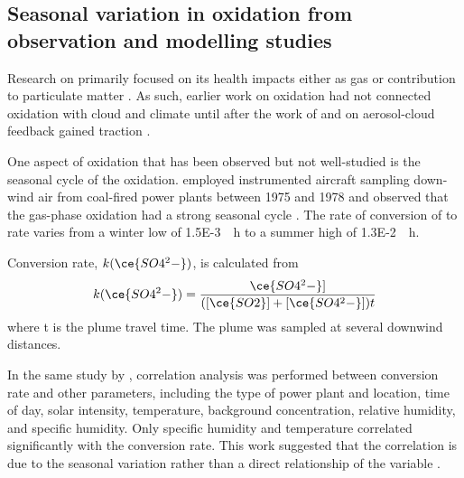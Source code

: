 \subsection{Seasonal variation in \textsoo{}  oxidation from observation and modelling studies}
\label{ch4:seasonal-so2-oxidation-observation}

Research on  primarily focused on its health impacts either as  gas or contribution to particulate matter \citep[e.g. ][]{forrestOnversionRatesPower1981, meagherSeasonalVariationAtmospheric1983,eatoughConversionSO2Sulfate1994, feichterSimulationTroposphericSulfur1996}. As such, earlier work on  oxidation had not connected  oxidation with cloud and climate until after the work of \citet{twomeyInfluencePollutionShortwave1977} and \citet{albrechtAerosolsCloudMicrophysics1989} on aerosol-cloud feedback gained traction \citep{charlsonPerturbationNorthernHemisphere1991, charlsonClimateForcingAnthropogenic1992}.  

One aspect of  oxidation that has been observed but not well-studied is the seasonal cycle of the oxidation. \citet{meagherSeasonalVariationAtmospheric1983} employed instrumented aircraft sampling down-wind air from coal-fired power plants between 1975 and 1978 and observed that the gas-phase  oxidation had a strong seasonal cycle \citep{meagherSeasonalVariationAtmospheric1983}. The rate of conversion of  to  rate varies from a winter low of \qty{1.5E-3}{\per\hour} to a summer high of \qty{1.3E-2}{\per\hour}. 


Conversion rate, $k(\ce{SO4^2-})$, is calculated from
\begin{equation}
k(\ce{SO4^2-}) = \frac{\ce{SO4^2-}]}{([\ce{SO2}]+[\ce{SO4^2-}])t}
\end{equation}
where t is the plume travel time. The plume was sampled at several downwind distances.


In the same study by \citet{meagherSeasonalVariationAtmospheric1983}, correlation analysis was performed between conversion rate and other parameters, including the type of power plant and location, time of day, solar intensity, temperature, background  concentration, relative humidity, and specific humidity. Only specific humidity and temperature correlated significantly with the conversion rate. This work suggested that the correlation is due to the seasonal variation rather than a direct relationship of the variable \citep{meagherSeasonalVariationAtmospheric1983}.


